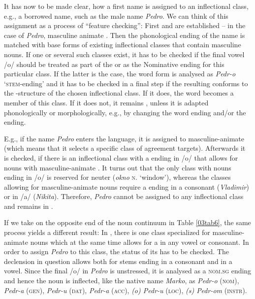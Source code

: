 \documentclass[output=paper,colorlinks,citecolor=brown]{langscibook}
\begin{document}
It has now to be made clear, how a first name is assigned to an inflectional class, e.g., a borrowed name, such as the male name \emph{Pedro}. We can think of this assignment as a process of ``feature checking'': First  and  are established -- in the case of \emph{Pedro}, masculine animate . Then the phonological ending of the name is matched with base forms of existing inflectional classes that contain masculine nouns. If one or several such classes exist, it has to be checked if the final vowel /o/ should be treated as part of the  or as the Nominative ending for this particular class. If the latter is the case, the word form is analysed as \emph{Pedr-o} `\textsc{stem}-ending' and it has to be checked in a final step if the resulting  conforms to the -structure of the chosen inflectional class. If it does, the word becomes a member of this class. If it does not, it remains , unless it is adapted phonologically or morphologically, e.g., by changing the word ending and/or the  ending.

E.g., if the name \emph{Pedro} enters the  language, it is assigned to masculine-animate  (which means that it selects a specific class of agreement targets). Afterwards it is checked, if there is an inflectional class with a  ending in /o/ that allows for nouns with masculine-animate . It turns out that the only class with nouns ending in /o/ is reserved for neuter  (\emph{okno} \textsc{n.} `window'), whereas the classes allowing for masculine-animate nouns
require a  ending in a consonant (\emph{Vladimir}) or in /a/ (\emph{Nikita}). Therefore, \emph{Pedro} cannot be assigned to any inflectional class and remains  in .

If we take  on the opposite end of the noun continuum in Table \ref{03tab6}, the same process yields a different result: In , there is one class specialized for masculine-animate nouns which at the same time allows for a  in any vowel or consonant. In order to assign \emph{Pedro} to this class, the status of its  has to be checked. The declension in question allows both for stems ending in a consonant and in a vowel. Since the final /o/ in \emph{Pedro} is unstressed, it is analysed as a \textsc{nom.sg} ending and hence the noun is inflected, like the native name \emph{Marko}, as \emph{Pedr-o} (\textsc{nom}), \emph{Pedr-a} (\textsc{gen}), \emph{Pedr-u} (\textsc{dat}), \emph{Pedr-a} (\textsc{acc}), \emph{(o) Pedr-u} (\textsc{loc}), \emph{(s) Pedr-om} (\textsc{instr}).
\end{document}
